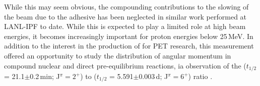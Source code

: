 While this may seem obvious, the compounding contributions to the slowing of the beam due to the adhesive has been neglected in similar work performed at LANL-IPF to date. 
While this is expected to play a limited role at high beam energies, it becomes increasingly important for proton energies below 25\,MeV.
In addition to the interest in the production of  for PET research, this measurement  offered an opportunity to study the distribution of angular momentum in compound nuclear and direct pre-equilibrium reactions, ia observation of the  ($t_{1/2}$ = 21.1$\pm$0.2\,min; J$^\pi=2^+$) to  ($t_{1/2}$ = 5.591$\pm$0.003\,d; J$^\pi=6^+$)   ratio \cite{Dong2015,Wang2017}.






% 


\vspace{1cm}



